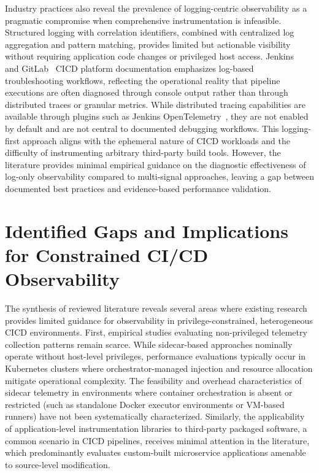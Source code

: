 Industry practices also reveal the prevalence of logging-centric observability as a pragmatic compromise when comprehensive instrumentation is infeasible. Structured logging with correlation identifiers, combined with centralized log aggregation and pattern matching, provides limited but actionable visibility without requiring application code changes or privileged host access. Jenkins~\parencite{jenkinsObservability} and GitLab~\parencite{gitlabObservability} \ac{CICD} platform documentation emphasizes log-based troubleshooting workflows, reflecting the operational reality that pipeline executions are often diagnosed through console output rather than through distributed traces or granular metrics. While distributed tracing capabilities are available through plugins such as Jenkins OpenTelemetry~\parencite{jenkinsOpenTelemetry}, they are not enabled by default and are not central to documented debugging workflows. This logging-first approach aligns with the ephemeral nature of \ac{CICD} workloads and the difficulty of instrumenting arbitrary third-party build tools. However, the literature provides minimal empirical guidance on the diagnostic effectiveness of log-only observability compared to multi-signal approaches, leaving a gap between documented best practices and evidence-based performance validation.


\section{Identified Gaps and Implications for Constrained CI/CD Observability}
\label{sec:identified-gaps}

The synthesis of reviewed literature reveals several areas where existing research provides limited guidance for observability in privilege-constrained, heterogeneous \ac{CICD} environments. First, empirical studies evaluating non-privileged telemetry collection patterns remain scarce. While sidecar-based approaches nominally operate without host-level privileges, performance evaluations typically occur in Kubernetes clusters where orchestrator-managed injection and resource allocation mitigate operational complexity. The feasibility and overhead characteristics of sidecar telemetry in environments where container orchestration is absent or restricted (such as standalone Docker executor environments or VM-based runners) have not been systematically characterized. Similarly, the applicability of application-level instrumentation libraries to third-party packaged software, a common scenario in \ac{CICD} pipelines, receives minimal attention in the literature, which predominantly evaluates custom-built microservice applications amenable to source-level modification.

